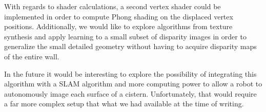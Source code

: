 \documentclass[twocolumn]{article}
\begin{document}
With regards to shader calculations, a second vertex shader could be implemented in order to compute Phong shading on the displaced vertex positions. Additionally, we would like to explore algorithms from texture synthesis and apply learning to a small subset of disparity images in order to generalize the small detailed geometry without having to acquire disparity maps of the entire wall.

In the future it would be interesting to explore the possibility of integrating this algorithm with a SLAM algorithm and more computing power to allow a robot to autonomously image each surface of a cistern. 
Unfortunately, that would require a far more complex setup that what we had available at the time of writing.





\end{document}
